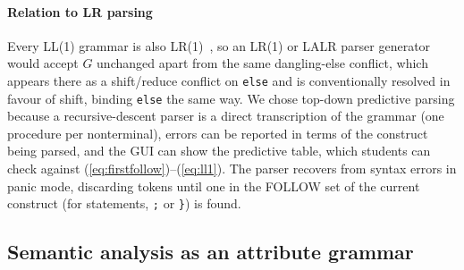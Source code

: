 \documentclass{ieeeaccess}
\newcommand{\tm}[1]{\texttt{#1}}
\begin{document}
\paragraph*{Relation to LR parsing}
Every LL(1) grammar is also LR(1)~\cite{knuth1965lr,lewis1968}, so an
LR(1) or LALR parser generator would accept $G$ unchanged apart from the
same dangling-else conflict, which appears there as a shift/reduce
conflict on \tm{else} and is conventionally resolved in favour of
shift, binding \tm{else} the same way. We chose top-down predictive
parsing because a recursive-descent parser is a direct transcription of
the grammar (one procedure per nonterminal), errors can be reported in
terms of the construct being parsed, and the GUI can show the
predictive table, which students can check against
(\ref{eq:firstfollow})--(\ref{eq:ll1}). The parser recovers from syntax
errors in panic mode, discarding tokens until one in the FOLLOW set of
the current construct (for statements, \tm{;} or \tm{\}}) is found.

\subsection{Semantic analysis as an attribute grammar}
\end{document}
